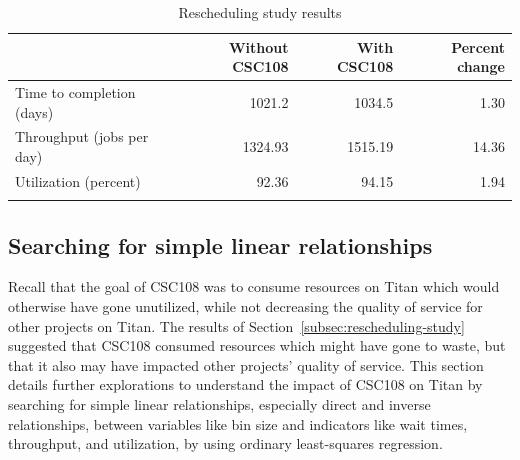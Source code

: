 \begin{table}
\caption{Rescheduling study results}
\label{tab:rescheduling-results}       %
\begin{tabular}{lrrr}
\hline\noalign{\smallskip}
\phantom{booga}     &   Without CSC108  &   With CSC108 &   Percent change  \\
\hline\noalign{\smallskip}
Time to completion (days)           &   1021.2  &   1034.5  &   1.30        \\
Throughput (jobs per day)           &   1324.93 &   1515.19 &   14.36       \\
Utilization (percent)               &   92.36   &   94.15   &   1.94        \\
\noalign{\smallskip}\hline
\end{tabular}
\end{table}


\subsection{Searching for simple linear relationships}
\label{subsec:simple-linear-relationships}



Recall that the goal of CSC108 was to consume resources on Titan which would
otherwise have gone unutilized, while not decreasing the quality of service for
other projects on Titan. The results of Section~\ref{subsec:rescheduling-study}
suggested that CSC108 consumed resources which might have gone to waste, but
that it also may have impacted other projects' quality of service. This section
details further explorations to understand the impact of CSC108 on Titan by
searching for simple linear relationships, especially direct and inverse
relationships, between variables like bin size and indicators like wait times,
throughput, and utilization, by using ordinary least-squares regression.

